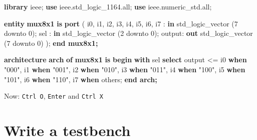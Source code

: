 \documentclass[11pt]{article}
\newenvironment{Shaded}{}{}
\newcommand{\KeywordTok}[1]{\textcolor[rgb]{0.00,0.44,0.13}{\textbf{{#1}}}}
\newcommand{\DataTypeTok}[1]{\textcolor[rgb]{0.56,0.13,0.00}{{#1}}}
\newcommand{\DecValTok}[1]{\textcolor[rgb]{0.25,0.63,0.44}{{#1}}}
\newcommand{\StringTok}[1]{\textcolor[rgb]{0.25,0.44,0.63}{{#1}}}
\newcommand{\OtherTok}[1]{\textcolor[rgb]{0.00,0.44,0.13}{{#1}}}
\newcommand{\ErrorTok}[1]{\textcolor[rgb]{1.00,0.00,0.00}{\textbf{{#1}}}}
\newcommand{\NormalTok}[1]{{#1}}
\begin{document}
\begin{Shaded}
\begin{Highlighting}[]
\KeywordTok{library}\NormalTok{ ieee;}
\KeywordTok{use}\NormalTok{ ieee}\OtherTok{.}\NormalTok{std\_logic\_1164}\OtherTok{.}\NormalTok{all;}
\KeywordTok{use}\NormalTok{ ieee}\OtherTok{.}\NormalTok{numeric\_std}\OtherTok{.}\NormalTok{all;}

\KeywordTok{entity} \KeywordTok{mux8x1} \KeywordTok{is}
    \KeywordTok{port}\NormalTok{ (}
\NormalTok{        i0}\OtherTok{,}
\NormalTok{        i1}\OtherTok{,}
\NormalTok{        i2}\OtherTok{,}
\NormalTok{        i3}\OtherTok{,}
\NormalTok{        i4}\OtherTok{,}
\NormalTok{        i5}\OtherTok{,}
\NormalTok{        i6}\OtherTok{,}
\NormalTok{        i7    }\OtherTok{:} \KeywordTok{in} \DataTypeTok{std\_logic\_vector}\NormalTok{ (}\DecValTok{7} \OtherTok{downto} \DecValTok{0}\NormalTok{);}
\NormalTok{        sel   }\OtherTok{:} \KeywordTok{in} \DataTypeTok{std\_logic\_vector}\NormalTok{ (}\DecValTok{2} \OtherTok{downto} \DecValTok{0}\NormalTok{);}
\NormalTok{        output}\OtherTok{:} \KeywordTok{out} \DataTypeTok{std\_logic\_vector}\NormalTok{ (}\DecValTok{7} \OtherTok{downto} \DecValTok{0}\NormalTok{)}
\NormalTok{    );}
\KeywordTok{end mux8x1;}

\KeywordTok{architecture} \KeywordTok{arch} \KeywordTok{of} \KeywordTok{mux8x1} \KeywordTok{is}
\KeywordTok{begin}
    \KeywordTok{with}\NormalTok{ sel }\KeywordTok{select}\NormalTok{ output }\OtherTok{\textless{}=}
\NormalTok{        i0 }\KeywordTok{when} \StringTok{"000"}\OtherTok{,}
\NormalTok{        i1 }\KeywordTok{when} \StringTok{"001"}\OtherTok{,}
\NormalTok{        i2 }\KeywordTok{when} \StringTok{"010"}\OtherTok{,}
\NormalTok{        i3 }\KeywordTok{when} \StringTok{"011"}\OtherTok{,}
\NormalTok{        i4 }\KeywordTok{when} \StringTok{"100"}\OtherTok{,}
\NormalTok{        i5 }\KeywordTok{when} \StringTok{"101"}\OtherTok{,}
\NormalTok{        i6 }\KeywordTok{when} \StringTok{"110"}\OtherTok{,}
\NormalTok{        i7 }\KeywordTok{when} \OtherTok{others}\NormalTok{;}
\ErrorTok{end arch;}
\end{Highlighting}
\end{Shaded}

Now: \texttt{Ctrl\ O}, \texttt{Enter} and \texttt{Ctrl\ X}

    \hypertarget{write-a-testbench}{%
\section{Write a testbench}\label{write-a-testbench}}
\end{document}

